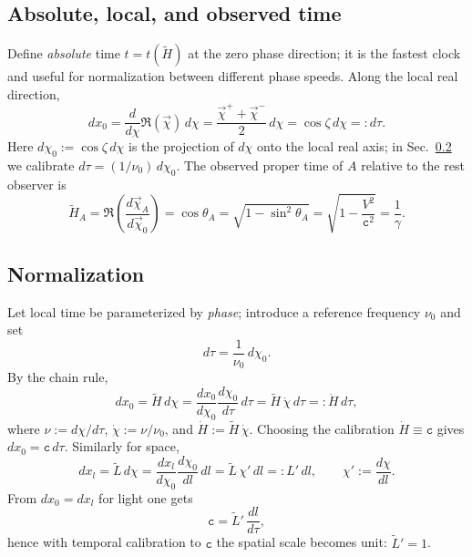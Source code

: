 \documentclass[11pt]{article}
\numberwithin{equation}{section}
\begin{document}
\subsection{Absolute, local, and observed time}
Define \emph{absolute} time $t=t(\tilde{H})$ at the zero phase direction; it is the fastest clock and useful for normalization between different phase speeds. Along the local real direction,
\begin{equation}
dx_0=\frac{d}{d\chi}\Re(\vec{\chi})\,d\chi
=\frac{\vec{\chi}^+ + \vec{\chi}^-}{2}\,d\chi
=\cos\zeta\,d\chi
=:d\tau.
\label{eq:321}
\end{equation}
Here $d\chi_0:=\cos\zeta\,d\chi$ is the projection of $d\chi$ onto the local real axis; in Sec.~\ref{sec:norm} we calibrate $d\tau=(1/\nu_0)\,d\chi_0$. The observed proper time of $A$ relative to the rest observer is
\begin{equation}
\tilde{H}_A=\Re\!\left(\frac{d\vec{\chi}_A}{d\vec{\chi}_0}\right)
=\cos\theta_A
=\sqrt{1-\sin^2\theta_A}
=\sqrt{1-\frac{V^2}{\mathtt{c}^2}}
=\frac{1}{\gamma}.
\label{eq:322}
\end{equation}

\subsection{Normalization}\label{sec:norm}
Let local time be parameterized by \emph{phase}; introduce a reference frequency $\nu_0$ and set
\begin{equation}
d\tau=\frac{1}{\nu_0}\,d\chi_0.
\label{eq:331}
\end{equation}
By the chain rule,
\begin{equation}
dx_0=\tilde{H}\,d\chi
=\frac{dx_0}{d\chi_0}\frac{d\chi_0}{d\tau}\,d\tau
=\tilde{H}\,\dot{\chi}\,d\tau
=: \dot{H}\,d\tau,
\label{eq:332}
\end{equation}
where $\nu:=d\chi/d\tau$, $\dot{\chi}:=\nu/\nu_0$, and $\dot{H}:=\tilde{H}\,\dot{\chi}$. Choosing the calibration $\dot{H}\equiv \mathtt{c}$ gives $dx_0=\mathtt{c}\,d\tau$. Similarly for space,
\begin{equation}
dx_l=\tilde{L}\,d\chi
=\frac{dx_l}{d\chi_0}\frac{d\chi_0}{dl}\,dl
=\tilde{L}\,\chi'\,dl
=:L'\,dl,\qquad \chi':=\frac{d\chi}{dl}.
\label{eq:333}
\end{equation}
From $dx_0=dx_l$ for light one gets
\begin{equation}
\mathtt{c}=\tilde{L}'\,\frac{dl}{d\tau},
\label{eq:334}
\end{equation}
hence with temporal calibration to $\mathtt{c}$ the spatial scale becomes unit: $\tilde{L}'=1$.
\end{document}
